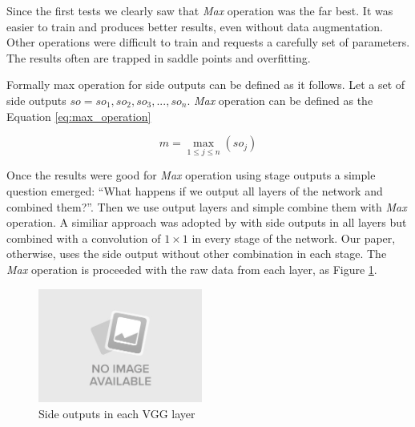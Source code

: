 Since the first tests we clearly saw that \textit{Max} operation was the far best. It was easier to train and produces better results, even without data augmentation. Other operations were difficult to train and requests a carefully set of parameters. The results often are trapped in saddle points and overfitting. 

Formally max operation for side outputs can be defined as it follows. Let a set of side outputs $\mathit{so} = \mathit{so_1, so_2, so_3, ..., so_n}$. \textit{Max} operation can be defined as the Equation \ref{eq:max_operation}

\begin{equation}
m = \max_{1 \leq j \leq n} (so_j)
\label{eq:max_operation}
\end{equation}

Once the results were good for \textit{Max} operation using stage outputs a simple question emerged: ``What happens if we output all layers of the network and combined them?''. Then we use output layers and simple combine them with \textit{Max} operation. A similiar approach was adopted by  with side outputs in all layers but combined with a convolution of $1 \times 1$ in every stage of the network. Our paper, otherwise, uses the side output without other combination in each stage. The \textit{Max} operation is proceeded with the raw data from each layer, as Figure \ref{fig:all_layers_outputs}.

\begin{figure}
  \centering
  \includegraphics[width=0.48\textwidth]{figures/no_image.jpeg}
  \caption{Side outputs in each VGG layer}
  \label{fig:all_layers_outputs}
\end{figure}
